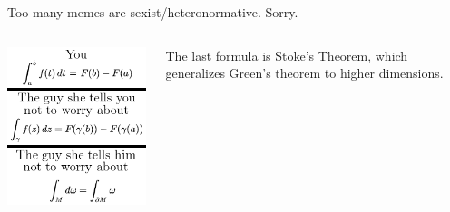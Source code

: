 \documentclass{beamer}
\begin{document}
\begin{frame}{Too many memes are sexist/heteronormative.  Sorry.}
\begin{columns}
\begin{column}{0.6\textwidth}
\includegraphics[width=\textwidth,height=0.8\textheight,keepaspectratio]{WorryAboutStokes.png}
\end{column}
\begin{column}{0.4\textwidth}  %

The last formula is Stoke's Theorem, which generalizes Green's theorem to higher dimensions.

\end{column}
\end{columns}

\end{frame}
\end{document}
